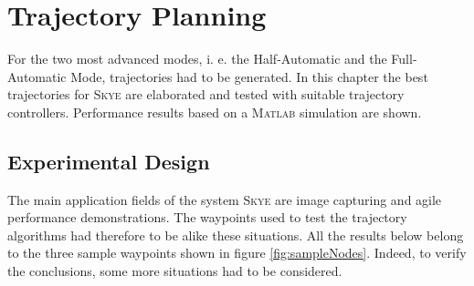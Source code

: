 \graphicspath{{graphics/}}

\chapter{Trajectory Planning}
\label{cha:trajectory}
For the two most advanced modes, i. e. the Half-Automatic and the Full-Automatic Mode, trajectories had to be generated. In this chapter the best trajectories for \textsc{Skye} are elaborated and tested with suitable trajectory controllers. Performance results based on a \textsc{Matlab} simulation are shown.



\section{Experimental Design}
The main application fields of the system \textsc{Skye} are image capturing and agile performance demonstrations. The waypoints used to test the trajectory algorithms had therefore to be alike these situations. All the results below belong to the three sample waypoints shown in figure \ref{fig:sampleNodes}. Indeed, to verify the conclusions, some more situations had to be considered.

